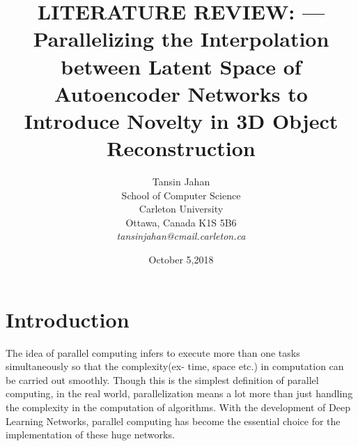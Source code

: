 \documentclass[11pt]{article}       %
\begin{document}


\title{LITERATURE REVIEW: --- Parallelizing the Interpolation between Latent Space of Autoencoder Networks to Introduce Novelty in 3D Object Reconstruction}


\author{
Tansin Jahan\\
School of Computer Science\\
Carleton University\\
Ottawa, Canada K1S 5B6\\
{\em tansinjahan@cmail.carleton.ca}
} %
\date{October 5,2018}
\maketitle



\section{Introduction} \label{intro}

The idea of parallel computing infers to execute more than one tasks simultaneously so that the complexity(ex- time, space etc.) in computation can be carried out smoothly. Though this is the simplest definition of parallel computing, in the real world, parallelization means a lot more than just handling the complexity in the computation of algorithms. With the development of Deep Learning Networks, parallel computing has become the essential choice for the implementation of these huge networks.
\end{document}
